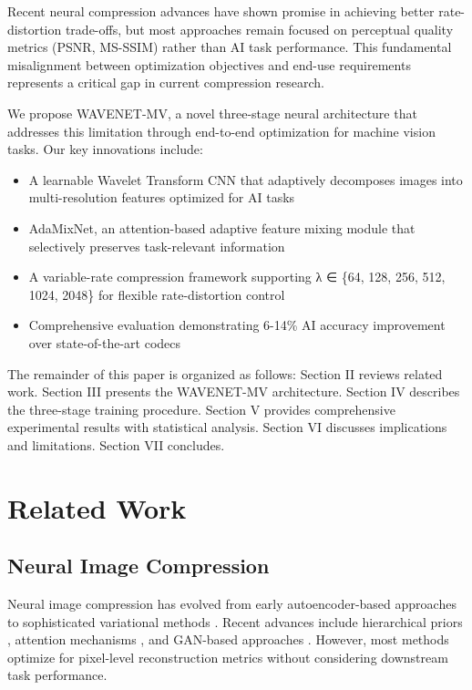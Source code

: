 \documentclass[conference]{IEEEtran}
\begin{document}
Recent neural compression advances \cite{balle2016end, balle2018variational, cheng2020learned} have shown promise in achieving better rate-distortion trade-offs, but most approaches remain focused on perceptual quality metrics (PSNR, MS-SSIM) rather than AI task performance. This fundamental misalignment between optimization objectives and end-use requirements represents a critical gap in current compression research.

We propose WAVENET-MV, a novel three-stage neural architecture that addresses this limitation through end-to-end optimization for machine vision tasks. Our key innovations include:

\begin{itemize}
\item A learnable Wavelet Transform CNN that adaptively decomposes images into multi-resolution features optimized for AI tasks
\item AdaMixNet, an attention-based adaptive feature mixing module that selectively preserves task-relevant information
\item A variable-rate compression framework supporting λ ∈ \{64, 128, 256, 512, 1024, 2048\} for flexible rate-distortion control
\item Comprehensive evaluation demonstrating 6-14\% AI accuracy improvement over state-of-the-art codecs
\end{itemize}

The remainder of this paper is organized as follows: Section II reviews related work. Section III presents the WAVENET-MV architecture. Section IV describes the three-stage training procedure. Section V provides comprehensive experimental results with statistical analysis. Section VI discusses implications and limitations. Section VII concludes.

\section{Related Work}

\subsection{Neural Image Compression}

Neural image compression has evolved from early autoencoder-based approaches \cite{balle2016end} to sophisticated variational methods \cite{balle2018variational}. Recent advances include hierarchical priors \cite{minnen2018joint}, attention mechanisms \cite{cheng2020learned}, and GAN-based approaches \cite{agustsson2019generative}. However, most methods optimize for pixel-level reconstruction metrics without considering downstream task performance.
\end{document}
